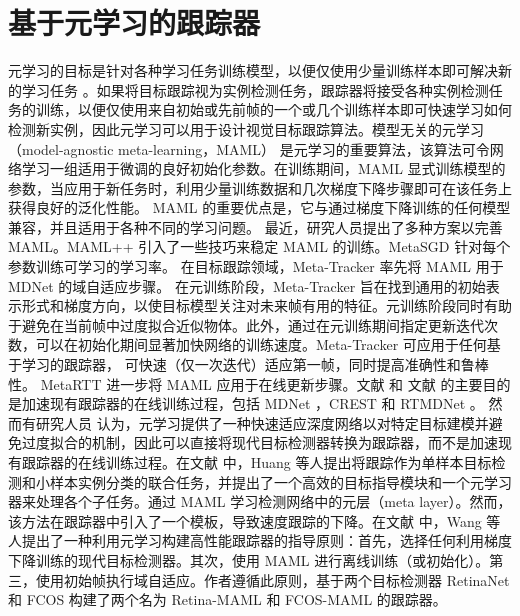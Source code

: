 \section{基于元学习的跟踪器} %
元学习的目标是针对各种学习任务训练模型，以便仅使用少量训练样本即可解决新的学习任务 \cite{MAML}。如果将目标跟踪视为实例检测任务，跟踪器将接受各种实例检测任务的训练，以便仅使用来自初始或先前帧的一个或几个训练样本即可快速学习如何检测新实例，因此元学习可以用于设计视觉目标跟踪算法。模型无关的元学习（model-agnostic meta-learning，MAML）\cite{MAML} 是元学习的重要算法，该算法可令网络学习一组适用于微调的良好初始化参数。在训练期间，MAML 显式训练模型的参数，当应用于新任务时，利用少量训练数据和几次梯度下降步骤即可在该任务上获得良好的泛化性能。 MAML 的重要优点是，它与通过梯度下降训练的任何模型兼容，并且适用于各种不同的学习问题。
最近，研究人员提出了多种方案以完善 MAML。MAML++ \cite{MAML++} 引入了一些技巧来稳定 MAML 的训练。MetaSGD \cite{MetaSGD} 针对每个参数训练可学习的学习率。
在目标跟踪领域，Meta-Tracker \cite{MetaTracker} 率先将 MAML 用于 MDNet \cite{MDNet} 的域自适应步骤。
在元训练阶段，Meta-Tracker 旨在找到通用的初始表示形式和梯度方向，以使目标模型关注对未来帧有用的特征。元训练阶段同时有助于避免在当前帧中过度拟合近似物体。此外，通过在元训练期间指定更新迭代次数，可以在初始化期间显著加快网络的训练速度。Meta-Tracker 可应用于任何基于学习的跟踪器，
可快速（仅一次迭代）适应第一帧，同时提高准确性和鲁棒性。
MetaRTT \cite{MetaRTT} 进一步将 MAML 应用于在线更新步骤。文献 \cite{MetaTracker} 和 文献 \cite{MetaRTT} 的主要目的是加速现有跟踪器的在线训练过程，包括 MDNet \cite{MDNet}，CREST \cite{CREST} 和 RTMDNet \cite{RTMDNet}。
然而有研究人员 \cite{huang2019bridging} 认为，元学习提供了一种快速适应深度网络以对特定目标建模并避免过度拟合的机制，因此可以直接将现代目标检测器转换为跟踪器，而不是加速现有跟踪器的在线训练过程。在文献 \cite{huang2019bridging} 中，Huang 等人提出将跟踪作为单样本目标检测和小样本实例分类的联合任务，并提出了一个高效的目标指导模块和一个元学习器来处理各个子任务。通过 MAML 学习检测网络中的元层（meta layer）。然而，该方法在跟踪器中引入了一个模板，导致速度跟踪的下降。在文献 \cite{TrackingBy} 中，Wang 等人提出了一种利用元学习构建高性能跟踪器的指导原则：首先，选择任何利用梯度下降训练的现代目标检测器。其次，使用 MAML 进行离线训练（或初始化）。第三，使用初始帧执行域自适应。作者遵循此原则，基于两个目标检测器 RetinaNet \cite{focal} 和 FCOS \cite{tian2019fcos} 构建了两个名为 Retina-MAML 和 FCOS-MAML 的跟踪器。
